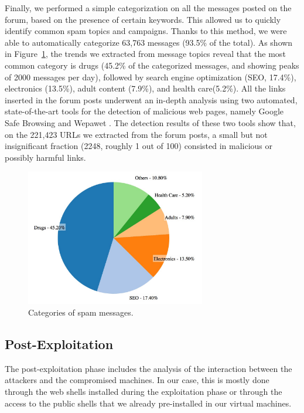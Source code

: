 Finally, we performed a simple categorization on all the messages posted on the forum, based on the presence of certain keywords. This allowed us to quickly identify common spam topics and campaigns. Thanks to this method, we were able to automatically categorize 63,763 messages (93.5\% of the total).
As shown in Figure~\ref{fig:SpamCategory}, the trends we extracted from message topics reveal that the most common category is drugs (45.2\% of the categorized messages, and showing peaks of 2000 messages per day), followed by search engine optimization (SEO, 17.4\%), electronics (13.5\%), adult content (7.9\%), and health care(5.2\%).
All the links inserted in the forum posts underwent an in-depth analysis using two automated, state-of-the-art tools for the detection of malicious web pages, namely Google Safe Browsing \cite{googleSafeBrowsing} and Wepawet \cite{wepaWet}. The detection results of these two tools show that, on the 221,423 URLs we extracted from the forum posts, a small but not insignificant fraction (2248, roughly 1 out of 100) consisted in malicious or possibly harmful links.

\begin{figure}[tbh]
\centerline{\includegraphics[width=0.7\textwidth]{Images/SpamCategory.jpg}}
\caption{Categories of spam messages.\label{fig:SpamCategory}}
\end{figure}

\subsection{Post-Exploitation}

The post-exploitation phase includes the analysis of the interaction between the attackers and the compromised machines. In our case, this is mostly done through the web shells installed during the exploitation phase or through the access to the public shells that we already pre-installed in our virtual machines.

